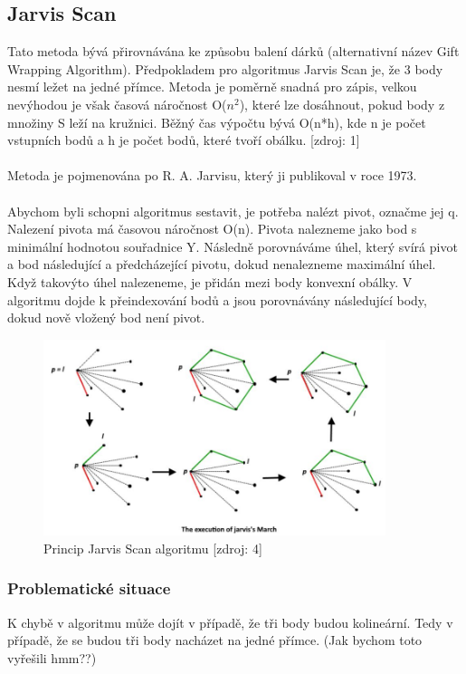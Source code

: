 \documentclass[a4paper, 12pt]{article}
\begin{document}
\subsection{Jarvis Scan}
Tato metoda bývá přirovnávána ke způsobu balení dárků (alternativní název Gift Wrapping Algorithm). Předpokladem pro algoritmus Jarvis Scan je, že 3 body nesmí ležet na jedné přímce. Metoda je poměrně snadná pro zápis, velkou nevýhodou je však časová náročnost O($n^2$), které lze dosáhnout, pokud body z množiny S leží na kružnici. Běžný čas výpočtu bývá O(n*h), kde n je počet vstupních bodů a h je počet bodů, které tvoří obálku. [zdroj: 1]\\
\\
Metoda je pojmenována po R. A. Jarvisu, který ji publikoval v roce 1973. \\
\\
Abychom byli schopni algoritmus sestavit, je potřeba nalézt pivot, označme jej q. Nalezení pivota má časovou náročnost O(n). Pivota nalezneme jako bod s minimální hodnotou souřadnice Y. Následně porovnáváme úhel, který svírá pivot a bod následující a předcházející pivotu, dokud nenalezneme maximální úhel. Když takovýto úhel nalezeneme, je přidán mezi body konvexní obálky. V algoritmu dojde k přeindexování bodů a jsou porovnávány následující body, dokud nově vložený bod není pivot. 

\begin{figure}[h!]
	\centering
	\includegraphics[width=10cm]{jarvis.jpg}
	\caption{Princip Jarvis Scan algoritmu [zdroj: 4]}
\end{figure}

\subsubsection{Problematické situace}
K chybě v algoritmu může dojít v případě, že tři body budou kolineární. Tedy v případě, že se budou tři body nacházet na jedné přímce. (Jak bychom toto vyřešili hmm??)
\end{document}

